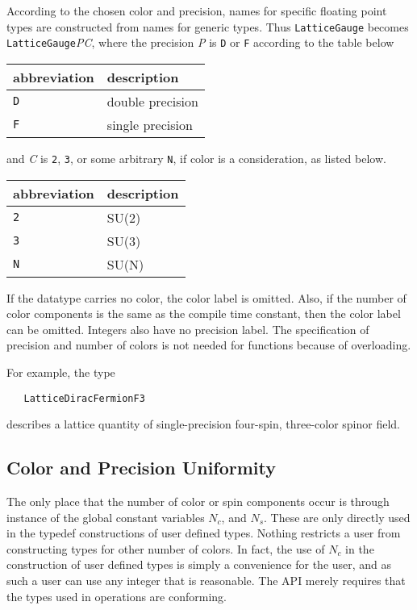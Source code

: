 \documentclass[12pt,letterpaper]{article}
\newcommand{\tLatticeColorMatrix}{LatticeGauge}
\begin{document}
According to the chosen color and precision, names for specific
floating point types are constructed from names for generic types.
Thus {\tt \tLatticeColorMatrix} becomes {\tt LatticeGauge}{\it PC},
where the precision {\it P} is {\tt D} or {\tt F} according to the
table below
\begin{center}
\begin{tabular}{|l|l|}
\hline
abbreviation & description \\
\hline
{\tt D}            & double precision \\
{\tt F}            & single precision \\
\hline
\end{tabular}
\end{center}
and {\it C} is {\tt 2}, {\tt 3}, or some arbitrary {\tt N}, if color is a
consideration, as listed below.
\begin{center}
\begin{tabular}{|l|l|}
\hline
abbreviation & description \\
\hline
{\tt 2}            & SU(2) \\
{\tt 3}            & SU(3) \\
{\tt N}            & SU(N) \\
\hline
\end{tabular}
\end{center}
If the datatype carries no color, the color label is omitted. Also,
if the number of color components is the same as the compile
time constant, then the color label can be omitted.
Integers also have no precision label. The specification of
precision and number of colors is not needed for functions because
of overloading.

For example, the type
%
\begin{verbatim}
   LatticeDiracFermionF3
\end{verbatim}
%
describes a lattice quantity of single-precision four-spin, 
three-color spinor field.

\subsection{Color and Precision Uniformity}

The only place that the number of color or spin components occur
is through instance of the global constant variables $N_c$, and $N_s$. These 
are only directly used in the typedef constructions of user defined types. Nothing
restricts a user from constructing types for other number of colors. In fact,
the use of $N_c$ in the construction of user defined types is simply a
convenience for the user, and as such a user can use any integer that is
reasonable. The API merely requires that the types used in operations are conforming.
\end{document}
